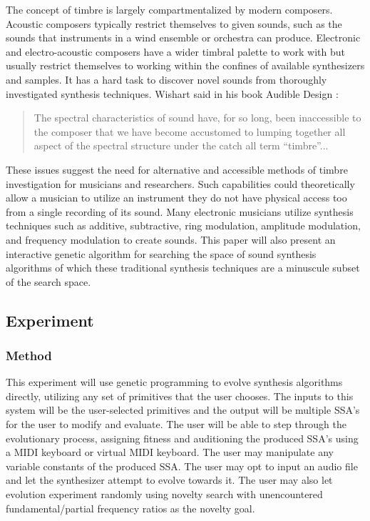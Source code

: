 \documentclass[12pt]{article}
\begin{document}
The concept of timbre is largely compartmentalized by modern composers. Acoustic composers typically restrict themselves to given sounds, such as the sounds that instruments in a wind ensemble or orchestra can produce. Electronic and electro-acoustic composers have a wider timbral palette to work with but usually restrict themselves to working within the confines of available synthesizers and samples. It has a hard task to discover novel sounds from thoroughly investigated synthesis techniques. Wishart said in his book Audible Design \citep{wishart1994audible}:
\begin{quote}
The spectral characteristics of sound have, for so long, been inaccessible to the composer that we have become accustomed to lumping together all aspect of the spectral structure under the catch all term ``timbre''...
\end{quote}	 
These issues suggest the need for alternative and accessible methods of timbre investigation for musicians and researchers. Such capabilities could theoretically allow a musician to utilize an instrument they do not have physical access too from a single recording of its sound. Many electronic musicians utilize synthesis techniques such as additive, subtractive, ring modulation, amplitude modulation, and frequency modulation to create sounds. This paper will also present an interactive genetic algorithm for searching the space of sound synthesis algorithms of which these traditional synthesis techniques are a minuscule subset of the search space.

\subsection{Experiment}
\subsubsection{Method}\label{IGAMETHOD}
This experiment will use genetic programming to evolve synthesis algorithms directly, utilizing any set of primitives that the user chooses. The inputs to this system will be the user-selected primitives and the output will be multiple SSA's for the user to modify and evaluate. The user will be able to step through the evolutionary process, assigning fitness and auditioning the produced SSA's using a MIDI keyboard or virtual MIDI keyboard. The user may manipulate any variable constants of the produced SSA. The user may opt to input an audio file and let the synthesizer attempt to evolve towards it. The user may also let evolution experiment randomly using novelty search with unencountered fundamental/partial frequency ratios as the novelty goal.
\end{document}

